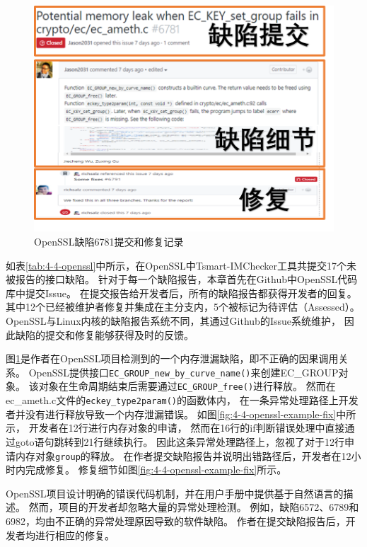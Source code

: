 \begin{figure}[t]
	\centering
	\includegraphics[width=0.8\linewidth]{figures/cp4-openssl-example.png}
	\caption{
		OpenSSL缺陷6781提交和修复记录
	}
	\label{fig:4-4-openssl-example}
\end{figure}



如表\ref{tab:4-4-openssl}中所示，在OpenSSL中Tsmart-IMChecker工具共提交17个未被报告的接口缺陷。
针对于每一个缺陷报告，本章首先在Github中OpenSSL代码库中提交Issue。
在提交报告给开发者后，所有的缺陷报告都获得开发者的回复。
其中12个已经被维护者修复并集成在主分支内，5个被标记为待评估（Assessed）。
OpenSSL与Linux内核的缺陷报告系统不同，其通过Github的Issue系统维护，
因此缺陷的提交和修复能够获得及时的反馈。



图\ref{fig:4-4-openssl-example}是作者在OpenSSL项目检测到的一个内存泄漏缺陷，即不正确的因果调用关系。
OpenSSL提供接口\texttt{EC\_GROUP\_new\_by\_curve\_name()}来创建EC\_GROUP对象。
该对象在生命周期结束后需要通过\texttt{EC\_GROUP\_free()}进行释放。
然而在ec\_ameth.c文件的\texttt{eckey\_type2param()}的函数体内，
在一条异常处理路径上开发者并没有进行释放导致一个内存泄漏错误。
如图\ref{fig:4-4-openssl-example-fix}中所示，
开发者在12行进行内存对象的申请，
然而在16行的if判断错误处理中直接通过goto语句跳转到21行继续执行。
因此这条异常处理路径上，忽视了对于12行申请内存对象\texttt{group}的释放。
在作者提交缺陷报告并说明出错路径后，开发者在12小时内完成修复。
修复细节如图\ref{fig:4-4-openssl-example-fix}所示。

OpenSSL项目设计明确的错误代码机制，并在用户手册中提供基于自然语言的描述。
然而，项目的开发者却忽略大量的异常处理检测。
例如，缺陷6572、6789和6982，均由不正确的异常处理原因导致的软件缺陷。
作者在提交缺陷报告后，开发者均进行相应的修复。




